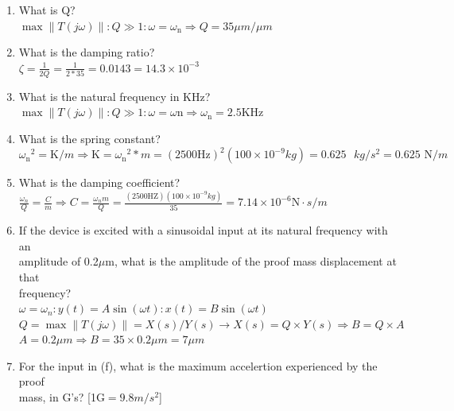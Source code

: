 \documentclass{article}
\begin{document}
\begin{enumerate}
	\item What is Q?\\
		$ \max \| T(j\omega) \| \colon Q \gg 1 \colon \omega = \omega_{\text{n}} 
		\Rightarrow Q = 35 \mu m /\mu m $
	\item What is the damping ratio?\\
		$ \zeta = \frac{1}{2 Q} = \frac{1}{2 * 35} = 0.0143 = 14.3 \times 10^{-3} $
	\item What is the natural frequency in KHz?\\
		$ \max \| T(j\omega) \| \colon Q \gg 1 \colon \omega = \omega{\text{n}}
		\Rightarrow \omega_{\text{n}} = 2.5 \text{KHz} $
	\item What is the spring constant?\\
		$ {\omega_{\text{n}}}^2 = \text{K} / m
		\Rightarrow \text{K} = {\omega_{\text{n}}}^2 * m
		= (2500 \text{Hz})^2 (100 \times 10^{-9} kg) = 0.625\text{ }kg/s^2
		= 0.625\text{ N}/m $
	\item What is the damping coefficient?\\
		$ \frac{\omega_{n}}{Q} = \frac{C}{m} 
		\Rightarrow C = \frac{\omega_n m}{Q} 
		= \frac{(2500 \text{HZ})( 100 \times 10^{-9} kg)}{35}
		= 7.14 \times 10^{-6} \text{N}\cdotp s /m $ 
	\item If the device is excited with a sinusoidal input at its natural frequency with an\\
   	amplitude of 0.2$\mu$m, what is the amplitude of the proof mass displacement at that\\
   	frequency?\\
		$ \omega = \omega_n \colon y(t) = A \sin (\omega t) \colon x(t) = B \sin (\omega t) $\\
		$ Q = \max \| T(j\omega) \| = X(s) / Y(s) \rightarrow X(s) = Q \times Y(s) 
		\Rightarrow B = Q \times A $ \\
		$ A = 0.2\mu m \Rightarrow B = 35 \times 0.2 \mu m = 7 \mu m $
	\item For the input in (f), what is the maximum accelertion experienced by the proof\\
		mass, in G's? [1G$ = 9.8 m/s^2$]\\

\end{enumerate}



\label{end}
\end{document}
